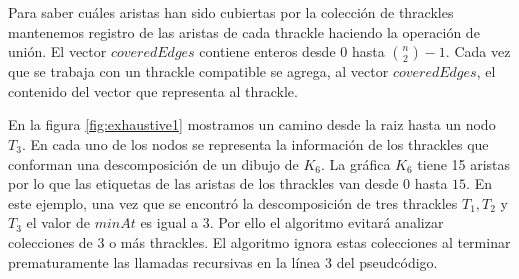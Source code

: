   Para saber cuáles aristas han sido cubiertas por la colección de thrackles mantenemos registro de las
  aristas de cada thrackle haciendo la operación de unión. El vector $coveredEdges$ contiene enteros desde
  $0$ hasta $\binom{n}{2}-1$. Cada vez que se trabaja con un thrackle compatible se agrega, al vector
  $coveredEdges$, el contenido del vector que representa al thrackle.

  En la figura \ref{fig:exhaustive1} mostramos un camino desde la raiz hasta un nodo $T_3$. En cada uno de
  los nodos se representa la información de los thrackles que conforman una descomposición de un dibujo de
  $K_6$. La gráfica $K_6$ tiene 15 aristas por lo que las etiquetas de las aristas de los thrackles van
  desde $0$ hasta $15$. En este ejemplo, una vez que se encontró la descomposición de tres thrackles $T_1,T_2$ y $T_3$ el valor de $minAt$ es igual a 3. Por ello el algoritmo evitará analizar colecciones de 3 o más thrackles. El algoritmo ignora estas colecciones al terminar prematuramente las llamadas recursivas en la línea 3 del pseudcódigo.
